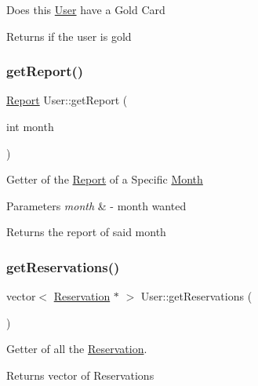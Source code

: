 Does this \mbox{\hyperlink{class_user}{User}} have a Gold Card \begin{DoxyReturn}{Returns}
if the user is gold 
\end{DoxyReturn}
\mbox{\label{class_user_ad5f236ca0846ae3fc493609f72d17a70}} 
\subsubsection{\texorpdfstring{get\+Report()}{getReport()}}
{\footnotesize\ttfamily \mbox{\hyperlink{class_report}{Report}} User\+::get\+Report (\begin{DoxyParamCaption}\item[{int}]{month }\end{DoxyParamCaption})}

Getter of the \mbox{\hyperlink{class_report}{Report}} of a Specific \mbox{\hyperlink{class_month}{Month}} 
\begin{DoxyParams}{Parameters}
{\em month} & -\/ month wanted \\
\hline
\end{DoxyParams}
\begin{DoxyReturn}{Returns}
the report of said month 
\end{DoxyReturn}
\mbox{\label{class_user_a7443c5c7b1cca31c8400130568050327}} 
\subsubsection{\texorpdfstring{get\+Reservations()}{getReservations()}}
{\footnotesize\ttfamily vector$<$ \mbox{\hyperlink{class_reservation}{Reservation}} $\ast$ $>$ User\+::get\+Reservations (\begin{DoxyParamCaption}{ }\end{DoxyParamCaption})}



Getter of all the \mbox{\hyperlink{class_reservation}{Reservation}}. 

\begin{DoxyReturn}{Returns}
vector of Reservations 
\end{DoxyReturn}
\mbox{\label{class_user_ac9fcbd4f944689de5faf746aa277d81a}} 
